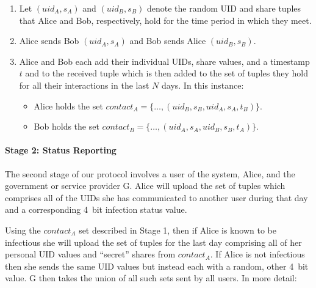 \documentclass{article}
\newcommand\david[1]{\textcolor{red}{#1}}
\begin{document}
\begin{enumerate}

    \item Let $(uid_A, s_{A})$ and $(uid_B, s_{B})$ denote the random UID and share tuples that Alice and Bob, respectively, hold for the time period in which they meet.
    
    \item Alice sends Bob $(uid_A, s_{A})$ and Bob sends Alice $(uid_B, s_{B})$.
    
    \item Alice and Bob each add their individual UIDs, share values, and a timestamp $t$ and to the received tuple which is then added to the set of tuples they hold for all their interactions in the last $N$ days. In this instance:
    \begin{itemize}
    
    \item Alice holds the set $contact_A = \{\dots, (uid_B, s_{B}, uid_A, s_{A}, t_{B})\}$.
    
    \item Bob holds the set $contact_B = \{\dots, (uid_A, s_{A}, uid_B, s_{B}, t_{A})\}$.
    
    \end{itemize}
\end{enumerate}    

\paragraph{Stage 2: Status Reporting}

The second stage of our protocol involves a user of the system, Alice, and the government or service provider G. Alice will upload the set of tuples which comprises all of the UIDs she has communicated to another user during that day and a corresponding 4~bit infection status value.  
 
Using the $contact_A$ set described in Stage 1, then if Alice is known to be infectious she will upload the set of tuples for the last day comprising all of her personal UID values and ``secret'' shares from $contact_A$. If Alice is not infectious then she sends the same UID values but instead each with a random, other 4~bit value. G then takes the union of all such sets sent by all users. In more detail: 
\end{document}
